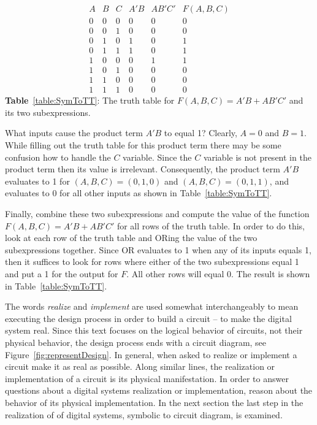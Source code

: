 $$\begin{array}{c|c|c||c|c||c}
A & B & C & A'B & AB'C' & F(A,B,C) \\ \hline \hline
0 & 0 & 0 & 0  &  0 &  0  \\ \hline
0 & 0 & 1 & 0  &  0 &  0  \\ \hline
0 & 1 & 0 & 1  &  0 &  1  \\ \hline
0 & 1 & 1 & 1  &  0 &  1  \\ \hline
1 & 0 & 0 & 0  &  1 &  1  \\ \hline
1 & 0 & 1 & 0  &  0 &  0  \\ \hline
1 & 1 & 0 & 0  &  0 &  0  \\ \hline
1 & 1 & 1 & 0  &  0 &  0 
\end{array} $$
\textbf{Table}~\ref{table:SymToTT}: The truth table for $F(A,B,C) = A'B + AB'C'$ and its  two subexpressions.


What inputs cause the product term $A'B$ to equal 1?  Clearly, $A=0$ and $B=1$.
While filling out the truth table for this product term there may be some
confusion
how to handle the $C$ variable.  Since the $C$ variable is not present in the 
product term then its value is irrelevant. Consequently, the product term $A'B$
evaluates to 1 for $(A,B,C)=(0,1,0)$ and $(A,B,C)=(0,1,1)$, and evaluates to 0
for all other inputs as shown in Table~\ref{table:SymToTT}.

Finally, combine these two subexpressions and compute the value
of the function $F(A,B,C) = A'B + AB'C'$ for all rows of the truth table. In 
order to do this, look at each row of the truth table and ORing the value of 
the two
subexpressions together.  Since OR evaluates to 1 when any of its inputs equals
1, then it suffices to look for rows where either of the two subexpressions equal
1 and put a 1 for the output for $F$.  All other rows will equal 0.  The result 
is shown in Table~\ref{table:SymToTT}.

The words \textit{ realize} and \textit{implement}   
are used somewhat interchangeably to mean executing the design
process in order to build a circuit -- to make the digital system real.  
Since this text focuses on the logical 
behavior of circuits, not their physical behavior, the design process ends with
a circuit diagram, see Figure~\ref{fig:representDesign}.  In general, when asked
to realize or implement a circuit make it as real as 
possible.  Along similar lines, the realization or implementation of a circuit 
is its physical manifestation.  In order to answer questions about a 
digital systems realization or implementation, reason about the behavior of its 
physical implementation.  In the next section the last step in the realization
of of digital systems, symbolic to circuit diagram, is examined.


